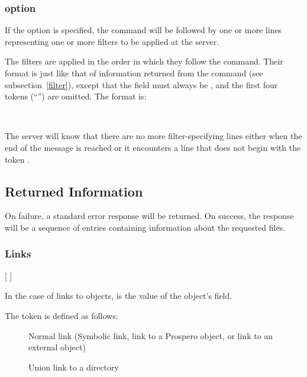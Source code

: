 \subsubsection{\protect{} option}

If the  option is specified, the  command will
be followed by one or more lines representing one or more
 filters to
be applied at the server.

The filters are applied in the order in which they follow the
 command.  Their format is just like that of 
 information returned from the  command (see
subsection~\ref{filter}), except that the  field must always
be , and the first four tokens (``'') are omitted.  The format is:
\begin{command}
     
  \\
	         \zoos {} \zoms{}\zome \zooe
\end{command}
The server will know that there are no more filter-specifying lines
either when the end of the message is reached or it encounters a line
that does not begin with the token .

\subsection{Returned Information}

On failure, a standard error response will be returned.  On success,
the response will be a sequence of entries containing information
about the requested files.

\subsubsection{Links}

\begin{command}
        
	  
	 [   ]
\end{command}

In the case of links to objects,  is the value
of the object's  field.  

The 
token is defined as follows:
\begin{description}
\item[] Normal link (Symbolic link, link to a Prospero object,
or link to an external object)
\item[] Union link to a directory
\end{description}

